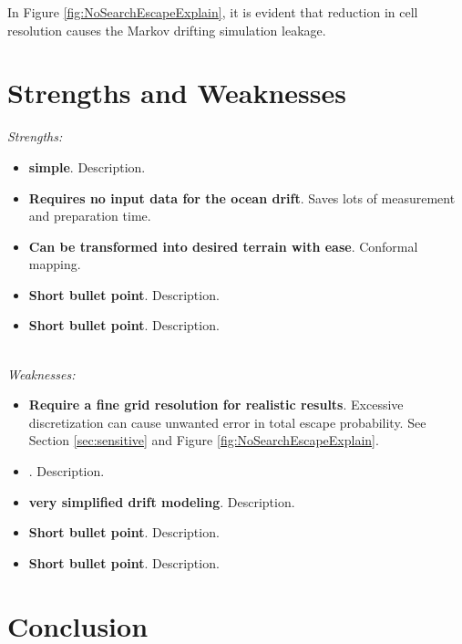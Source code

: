 \documentclass[12pt, letterpaper]{article}  %
\theoremstyle{definition}
\theoremstyle{remark}
\theoremstyle{plain}
\begin{document}
In Figure \ref{fig:NoSearchEscapeExplain}, it is evident that reduction in cell resolution causes the Markov drifting simulation leakage.


\section{Strengths and Weaknesses}\label{sec:sandw}


\textit{Strengths:}
\begin{itemize}
\item \textbf{simple}.  Description.
\item \textbf{Requires no input data for the ocean drift}. Saves lots of measurement and preparation time.
\item \textbf{Can be transformed into desired terrain with ease}.  Conformal mapping.
\item \textbf{Short bullet point}.  Description.
\item \textbf{Short bullet point}.  Description.
\end{itemize}
\ \\
\noindent \textit{Weaknesses:}
\begin{itemize}
\item \textbf{Require a fine grid resolution for realistic results}. Excessive discretization can cause unwanted error in total escape probability. See Section \ref{sec:sensitive} and Figure \ref{fig:NoSearchEscapeExplain}.
\item \textbf{}.  Description.
\item \textbf{very simplified drift modeling}.  Description.
\item \textbf{Short bullet point}.  Description.
\item \textbf{Short bullet point}.  Description.
\end{itemize}








\section{Conclusion}\label{sec:conclusion}
\end{document}
